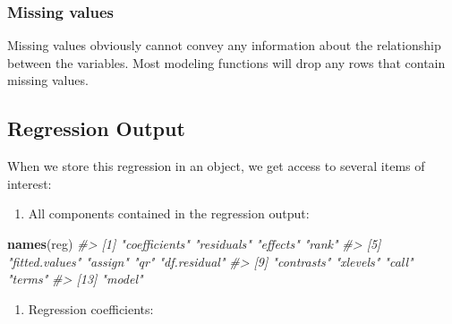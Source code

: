 \documentclass[]{book}
\newenvironment{Shaded}{\begin{snugshade}}{\end{snugshade}}
\newcommand{\KeywordTok}[1]{\textcolor[rgb]{0.13,0.29,0.53}{\textbf{#1}}}
\newcommand{\CommentTok}[1]{\textcolor[rgb]{0.56,0.35,0.01}{\textit{#1}}}
\newcommand{\OperatorTok}[1]{\textcolor[rgb]{0.81,0.36,0.00}{\textbf{#1}}}
\newcommand{\NormalTok}[1]{#1}
\providecommand{\tightlist}{%
  \setlength{\itemsep}{0pt}\setlength{\parskip}{0pt}}
\begin{document}
\subsubsection*{Missing values}\label{missing-values}

Missing values obviously cannot convey any information about the
relationship between the variables. Most modeling functions will drop
any rows that contain missing values.

\subsection{Regression Output}\label{regression-output}

When we store this regression in an object, we get access to several
items of interest:

\begin{enumerate}
\def\labelenumi{\arabic{enumi}.}
\tightlist
\item
  All components contained in the regression output:
\end{enumerate}

\begin{Shaded}
\begin{Highlighting}[]
\KeywordTok{names}\NormalTok{(reg)}
\CommentTok{#>  [1] "coefficients"  "residuals"     "effects"       "rank"         }
\CommentTok{#>  [5] "fitted.values" "assign"        "qr"            "df.residual"  }
\CommentTok{#>  [9] "contrasts"     "xlevels"       "call"          "terms"        }
\CommentTok{#> [13] "model"}
\end{Highlighting}
\end{Shaded}

\begin{enumerate}
\def\labelenumi{\arabic{enumi}.}
\setcounter{enumi}{1}
\tightlist
\item
  Regression coefficients:
\end{enumerate}

\begin{Shaded}
\end{Shaded}
\end{document}
